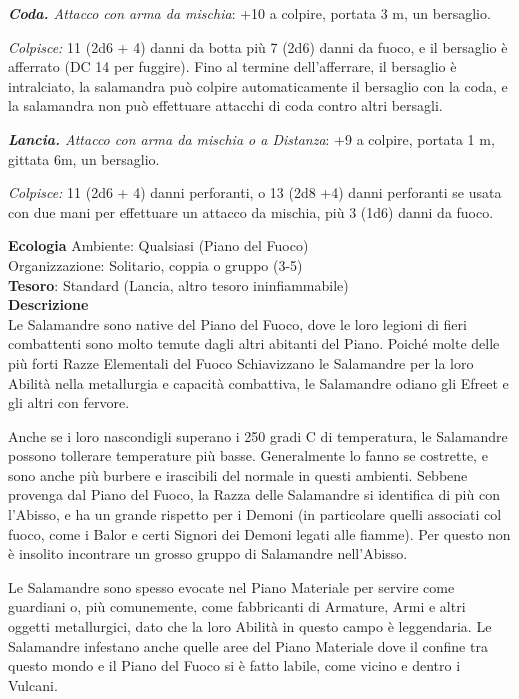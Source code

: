 \begin{multicols}{2}
	\textit{\textbf{Coda.} Attacco con arma da mischia}: +10 a colpire, portata 3 m, un bersaglio.

	\textit{Colpisce:} 11 (2d6 + 4) danni da botta più 7 (2d6) danni da fuoco, e il bersaglio è afferrato (DC 14 per fuggire). Fino al termine dell'afferrare, il bersaglio è intralciato, la salamandra può colpire automaticamente il bersaglio con la coda, e la salamandra non può effettuare attacchi di coda contro altri bersagli.

	\textit{\textbf{Lancia.} Attacco con arma da mischia o a Distanza}: +9 a colpire, portata 1 m, gittata 6m, un bersaglio.

	\textit{Colpisce:} 11 (2d6 + 4) danni perforanti, o 13 (2d8 +4) danni perforanti se usata con due mani per effettuare un attacco da mischia, più 3 (1d6) danni da fuoco.

	\textbf{Ecologia}
	Ambiente: Qualsiasi (Piano del Fuoco)\\
	Organizzazione: Solitario, coppia o gruppo (3-5)\\
	\textbf{Tesoro}: Standard (Lancia, altro tesoro ininfiammabile)\\
	\textbf{Descrizione}\\
	Le Salamandre sono native del Piano del Fuoco, dove le loro legioni di fieri combattenti sono molto temute dagli altri abitanti del Piano. Poiché molte delle più forti Razze Elementali del Fuoco Schiavizzano le Salamandre per la loro Abilità nella metallurgia e capacità combattiva, le Salamandre odiano gli Efreet e gli altri con fervore.

	Anche se i loro nascondigli superano i 250 gradi C di temperatura, le Salamandre possono tollerare temperature più basse. Generalmente lo fanno se costrette, e sono anche più burbere e irascibili del normale in questi ambienti. Sebbene provenga dal Piano del Fuoco, la Razza delle Salamandre si identifica di più con l'Abisso, e ha un grande rispetto per i Demoni (in particolare quelli associati col fuoco, come i Balor e certi Signori dei Demoni legati alle fiamme). Per questo non è insolito incontrare un grosso gruppo di Salamandre nell'Abisso.

	Le Salamandre sono spesso evocate nel Piano Materiale per servire come guardiani o, più comunemente, come fabbricanti di Armature, Armi e altri oggetti metallurgici, dato che la loro Abilità in questo campo è leggendaria. Le Salamandre infestano anche quelle aree del Piano Materiale dove il confine tra questo mondo e il Piano del Fuoco si è fatto labile, come vicino e dentro i Vulcani.


\end{multicols}
